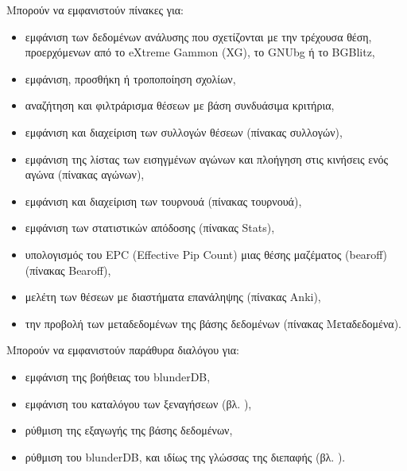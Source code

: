 \documentclass[letterpaper,10pt,greek]{sphinxmanual}
\begin{document}
\sphinxAtStartPar
Μπορούν να εμφανιστούν πίνακες για:
\begin{itemize}
\item {} 
\sphinxAtStartPar
εμφάνιση των δεδομένων ανάλυσης που σχετίζονται με την τρέχουσα θέση, προερχόμενων από το eXtreme Gammon (XG), το GNUbg ή το BGBlitz,

\item {} 
\sphinxAtStartPar
εμφάνιση, προσθήκη ή τροποποίηση σχολίων,

\item {} 
\sphinxAtStartPar
αναζήτηση και φιλτράρισμα θέσεων με βάση συνδυάσιμα κριτήρια,

\item {} 
\sphinxAtStartPar
εμφάνιση και διαχείριση των συλλογών θέσεων (πίνακας συλλογών),

\item {} 
\sphinxAtStartPar
εμφάνιση της λίστας των εισηγμένων αγώνων και πλοήγηση στις κινήσεις ενός αγώνα (πίνακας αγώνων),

\item {} 
\sphinxAtStartPar
εμφάνιση και διαχείριση των τουρνουά (πίνακας τουρνουά),

\item {} 
\sphinxAtStartPar
εμφάνιση των στατιστικών απόδοσης (πίνακας Stats),

\item {} 
\sphinxAtStartPar
υπολογισμός του EPC (Effective Pip Count) μιας θέσης μαζέματος (bearoff) (πίνακας Bearoff),

\item {} 
\sphinxAtStartPar
μελέτη των θέσεων με διαστήματα επανάληψης (πίνακας Anki),

\item {} 
\sphinxAtStartPar
την προβολή των μεταδεδομένων της βάσης δεδομένων (πίνακας Μεταδεδομένα).

\end{itemize}

\sphinxAtStartPar
Μπορούν να εμφανιστούν παράθυρα διαλόγου για:
\begin{itemize}
\item {} 
\sphinxAtStartPar
εμφάνιση της βοήθειας του blunderDB,

\item {} 
\sphinxAtStartPar
εμφάνιση του καταλόγου των ξεναγήσεων (βλ. {\hyperref[\detokenize{manuel:visites-guidees}]{}}),

\item {} 
\sphinxAtStartPar
ρύθμιση της εξαγωγής της βάσης δεδομένων,

\item {} 
\sphinxAtStartPar
ρύθμιση του blunderDB, και ιδίως της γλώσσας της διεπαφής (βλ. {\hyperref[\detokenize{manuel:configuration}]{}}).

\end{itemize}
\end{document}
